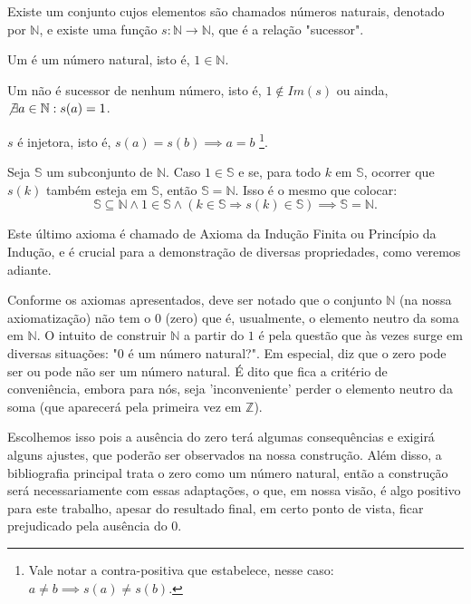 \documentclass[../main.tex]{subfiles}
\begin{document}
\begin{axi}\label{nat-axi-existeConjuntoNeFuncaoS}
    Existe um conjunto cujos elementos são chamados números naturais, denotado por $\mathbb{N}$, e existe uma função $s: \mathbb{N} \rightarrow \mathbb{N}$, que é a relação "sucessor". 
\end{axi}
\begin{axi}\label{nat-axi-umNatural}
    Um é um número natural, isto é, $1 \in \mathbb{N}$.
\end{axi}
\begin{axi}\label{nat-axi-umNaoSucessor}
    Um não é sucessor de nenhum número, isto é, $1 \not \in Im(s)$ ou ainda, $\not \exists a \in \mathbb{N} : s(a) = 1$.
\end{axi}
\begin{axi}\label{nat-axi-SInjetora}
    $s$ é injetora, isto é, $s(a) = s(b) \implies a = b$ \footnote{Vale notar a contra-positiva que estabelece, nesse caso: $a \neq b \implies s(a) \neq s(b)$.}.
\end{axi}
\begin{axi}\label{nat-axi-inducaoFinita}
    Seja $\mathbb{S}$ um subconjunto de $\mathbb{N}$. Caso $1 \in \mathbb{S}$ e se, para todo $k$ em $\mathbb{S}$, ocorrer que $s(k)$ também esteja em $\mathbb{S}$, então $\mathbb{S} = \mathbb{N}$. Isso é o mesmo que colocar: \\
     \[ \mathbb{S} \subseteq \mathbb{N} \land 1 \in \mathbb{S} \land ( k \in \mathbb{S} \Rightarrow s(k) \in \mathbb{S}) \implies \mathbb{S} = \mathbb{N} .\]
\end{axi}
Este último axioma é chamado de Axioma da Indução Finita ou Princípio da Indução, e é crucial para a demonstração de diversas propriedades, como veremos adiante.

Conforme os axiomas apresentados, deve ser notado que o conjunto $\mathbb{N}$ (na nossa axiomatização) não tem o $0$ (zero) que é, usualmente, o elemento neutro da soma em $\mathbb{N}$. O intuito de construir $\mathbb{N}$ a partir do $1$ é pela questão que às vezes surge em diversas situações: "$0$ é um número natural?". Em especial, \textcite{lima-site} diz que o zero pode ser ou pode não ser um número natural. É dito que fica a critério de conveniência, embora para nós, seja 'inconveniente' perder o elemento neutro da soma (que aparecerá pela primeira vez em $\mathbb{Z}$). 

Escolhemos isso pois a ausência do zero terá algumas consequências e exigirá alguns ajustes, que poderão ser observados na nossa construção. Além disso, a bibliografia principal trata o zero como um número natural, então a construção será necessariamente com essas adaptações, o que, em nossa visão, é algo positivo para este trabalho, apesar do resultado final, em certo ponto de vista, ficar prejudicado pela ausência do $0$.
\end{document}
